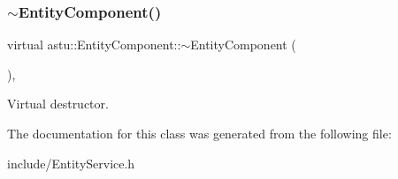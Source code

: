 \subsubsection{\texorpdfstring{$\sim$\+Entity\+Component()}{~EntityComponent()}}
{\footnotesize\ttfamily virtual astu\+::\+Entity\+Component\+::$\sim$\+Entity\+Component (\begin{DoxyParamCaption}{ }\end{DoxyParamCaption})\hspace{0.3cm}{\ttfamily [inline]}, {\ttfamily [virtual]}}

Virtual destructor. 

The documentation for this class was generated from the following file\+:\begin{DoxyCompactItemize}
\item 
include/Entity\+Service.\+h\end{DoxyCompactItemize}
